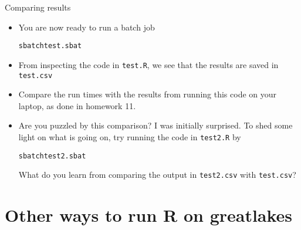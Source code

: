 \begin{frame}[fragile]{Comparing results}

\begin{itemize}
\item You are now ready to run a batch job
\begin{knitrout}\small
{}\color{fgcolor}\begin{kframe}
\begin{alltt}
sbatch test.sbat
\end{alltt}
\end{kframe}
\end{knitrout}
\item
From inspecting the code in \texttt{test.R}, we see that the results are saved in \texttt{test.csv}
\item
Compare the run times with the results from running this code on your laptop, as done in homework 11.
\item
Are you puzzled by this comparison? I was initially surprised. To shed some light on what is going on, try running the code in \texttt{test2.R} by
\begin{knitrout}\small
{}\color{fgcolor}\begin{kframe}
\begin{alltt}
sbatch test2.sbat
\end{alltt}
\end{kframe}
\end{knitrout}
What do you learn from comparing the output in \texttt{test2.csv} with \texttt{test.csv}?

\end{itemize}

\end{frame}

\section{Other ways to run R on greatlakes}

